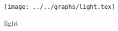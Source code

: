 \begin{figure}[h] \centering\texttt{[image: ../../graphs/light.tex]}\caption{light}\label{gr:light} \end{figure}
